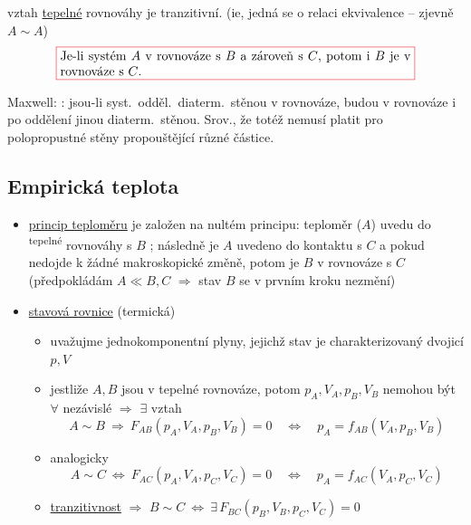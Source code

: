 \begin{veta}
vztah \underline{tepelné} rovnováhy je tranzitivní. \hfill {\small (ie, jedná se o relaci ekvivalence -- zjevně $A\sim A$)}
\[
  \fcolorbox{Red}{white}{\parbox{0.8\linewidth}{Je-li systém $A$ v rovnováze s $B$ a zároveň s $C$, potom i $B$ je v rovnováze s $C$.}}
\]
\end{veta}
\textcolor{OliveGreen}{\small Maxwell: : jsou-li syst.\ odděl.\ diaterm.\ stěnou v rovnováze, budou v rovnováze i po oddělení jinou diaterm.\ stěnou. Srov., že totéž nemusí platit pro polopropustné stěny propouštějící různé částice.}

\subsection{Empirická teplota}
\begin{itemize}
  \item[--] \underline{princip teploměru} je založen na nultém principu: teploměr ($A$) uvedu do \textsuperscript{tepelné} rovnováhy s $B$ ; následně je $A$ uvedeno do kontaktu s $C$ a pokud nedojde k žádné makroskopické změně, potom je $B$ v rovnováze s $C$ \\
            (předpokládám $A \ll B, C$ $\Rightarrow$ stav $B$ se v prvním kroku nezmění)
  \item \underline{stavová rovnice} (termická)
  \begin{itemize}
    \item[--] uvažujme jednokomponentní plyny, jejichž stav je charakterizovaný dvojicí $p, V$
    \item[--] jestliže $A, B$ jsou v tepelné rovnováze, potom $p_A, V_A, p_B, V_B$ nemohou být $\forall$ nezávislé $\Rightarrow$ $\exists$ vztah \\
          \[
            A\sim B \ \Rightarrow\ F_{AB}(p_A,V_A,p_B,V_B) = 0 \quad\Leftrightarrow\quad p_A = f_{AB}(V_A,p_B,V_B)
          \]
    \item[--] analogicky
          \[
            A\sim C \ \Leftrightarrow\ F_{AC}(p_A,V_A,p_C,V_C) = 0 \quad\Leftrightarrow\quad p_A = f_{AC}(V_A,p_C,V_C)
          \]
    \item[--] \underline{tranzitivnost} $\Rightarrow$ \quad $B\sim C \ \Leftrightarrow\ \exists\, F_{BC}(p_B,V_B,p_C,V_C) = 0$
  \end{itemize}
\end{itemize}

